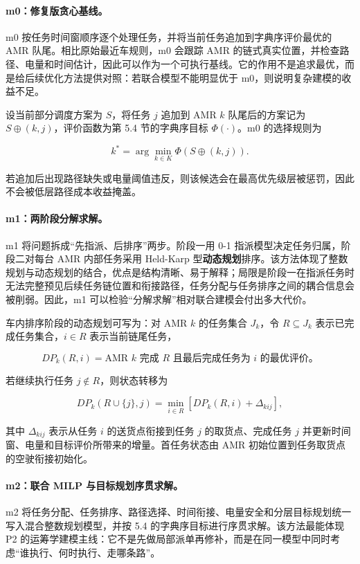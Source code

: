 \paragraph{m0：修复版贪心基线。}
m0 按任务时间窗顺序逐个处理任务，并将当前任务追加到字典序评价最优的 AMR 队尾。相比原始最近车规则，m0 会跟踪 AMR 的链式真实位置，并检查路径、电量和时间估计，因此可以作为一个可执行基线。它的作用不是追求最优，而是给后续优化方法提供对照：若联合模型不能明显优于 m0，则说明复杂建模的收益不足。

设当前部分调度方案为 $S$，将任务 $j$ 追加到 AMR $k$ 队尾后的方案记为 $S\oplus(k,j)$，评价函数为第 5.4 节的字典序目标 $\Phi(\cdot)$。m0 的选择规则为

\[
k^*=\arg\min_{k\in K}\Phi\left(S\oplus(k,j)\right).
\]

若追加后出现路径缺失或电量阈值违反，则该候选会在最高优先级层被惩罚，因此不会被低层路径成本收益掩盖。

\paragraph{m1：两阶段分解求解。}
m1 将问题拆成“先指派、后排序”两步。阶段一用 0-1 指派模型决定任务归属，阶段二对每台 AMR 内部任务采用 Held-Karp 型\textbf{动态规划}排序。该方法体现了整数规划与动态规划的结合，优点是结构清晰、易于解释；局限是阶段一在指派任务时无法完整预见后续任务链位置和衔接路径，任务分配与任务排序之间的耦合信息会被削弱。因此，m1 可以检验“分解求解”相对联合建模会付出多大代价。

车内排序阶段的动态规划可写为：对 AMR $k$ 的任务集合 $J_k$，令 $R\subseteq J_k$ 表示已完成任务集合，$i\in R$ 表示当前链尾任务，

\[
DP_k(R,i)=\text{AMR }k\text{ 完成 }R\text{ 且最后完成任务为 }i\text{ 的最优评价。}
\]

若继续执行任务 $j\notin R$，则状态转移为

\[
DP_k(R\cup\{j\},j)=
\min_{i\in R}
\left[
DP_k(R,i)+\Delta_{kij}
\right],
\]

其中 $\Delta_{kij}$ 表示从任务 $i$ 的送货点衔接到任务 $j$ 的取货点、完成任务 $j$ 并更新时间窗、电量和目标评价所带来的增量。首任务状态由 AMR 初始位置到任务取货点的空驶衔接初始化。

\paragraph{m2：联合 MILP 与目标规划序贯求解。}
m2 将任务分配、任务排序、路径选择、时间衔接、电量安全和分层目标规划统一写入混合整数规划模型，并按 5.4 的字典序目标进行序贯求解。该方法最能体现 P2 的运筹学建模主线：它不是先做局部派单再修补，而是在同一模型中同时考虑“谁执行、何时执行、走哪条路”。

